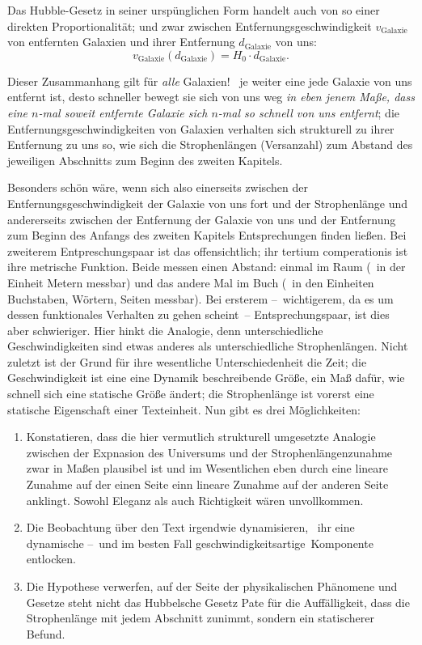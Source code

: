 Das Hubble-Gesetz in seiner urspünglichen Form handelt auch von so einer
  direkten Proportionalität; und zwar zwischen Entfernungsgeschwindigkeit
  $v_{\text{Galaxie}}$ von entfernten Galaxien und ihrer Entfernung
  $d_{\text{Galaxie}}$ von uns:
  \begin{equation}
    v_{\text{Galaxie}}(d_{\text{Galaxie}}) = H_{0} \cdot d_{\text{Galaxie}}\text{.}
  \end{equation}

Dieser Zusammanhang gilt für \emph{alle} Galaxien! \Dhei\ je weiter eine jede
  Galaxie von uns entfernt ist, desto schneller bewegt sie sich von uns weg
  \emph{in eben jenem Maße, dass eine $n$-mal soweit entfernte Galaxie sich
  $n$-mal so schnell von uns entfernt}; die Entfernungsgeschwindigkeiten von
  Galaxien verhalten sich strukturell zu ihrer Entfernung zu uns so, wie sich
  die Strophenlängen (Versanzahl) zum Abstand des jeweiligen Abschnitts zum
  Beginn des zweiten Kapitels.

Besonders schön wäre, wenn sich also einerseits zwischen der
  Entfernungsgeschwindigkeit der Galaxie von uns fort und der Strophenlänge
  und andererseits zwischen der Entfernung der Galaxie von uns und der
  Entfernung zum Beginn des Anfangs des zweiten Kapitels Entsprechungen finden
  ließen.
Bei zweiterem Entpreschungspaar ist das offensichtlich; ihr tertium
  comperationis ist ihre metrische Funktion.
  Beide messen einen Abstand: einmal im Raum (\zB\ in der Einheit Metern
  messbar) und das andere Mal im Buch (\zB\ in den Einheiten Buchstaben,
  Wörtern, Seiten messbar).
Bei ersterem --~wichtigerem, da es um dessen funktionales Verhalten zu gehen
  scheint~-- Entsprechungspaar, ist dies aber schwieriger.
Hier hinkt die Analogie, denn unterschiedliche Geschwindigkeiten sind etwas
  anderes als unterschiedliche Strophenlängen.
Nicht zuletzt ist der Grund für ihre wesentliche Unterschiedenheit die Zeit;
  die Geschwindigkeit ist eine eine Dynamik beschreibende Größe, ein Maß dafür,
  wie schnell sich eine statische Größe ändert; die Strophenlänge ist vorerst
  eine statische Eigenschaft einer Texteinheit.
Nun gibt es drei Möglichkeiten:
\begin{enumerate}
  \item Konstatieren, dass die hier vermutlich strukturell umgesetzte Analogie
      zwischen der Expnasion des Universums und der Strophenlängenzunahme zwar
      in Maßen plausibel ist und im Wesentlichen eben durch eine lineare Zunahme
      auf der einen Seite einn lineare Zunahme auf der anderen Seite anklingt.
    Sowohl Eleganz als auch Richtigkeit wären unvollkommen.
  \item Die Beobachtung über den Text irgendwie \glqq dynamisieren\grqq, \dh\
    ihr eine dynamische --~und im besten Fall \glqq
    geschwindigkeitsartige\grqq\ Komponente entlocken.
  \item Die Hypothese verwerfen, auf der Seite der physikalischen Phänomene
    und Gesetze steht nicht das Hubbelsche Gesetz Pate für die Auffälligkeit,
    dass die Strophenlänge mit jedem Abschnitt zunimmt, sondern ein
    statischerer Befund.
\end{enumerate}

